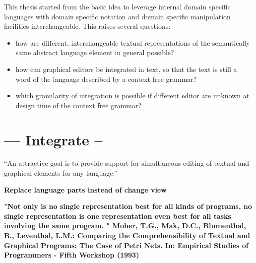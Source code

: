 This thesis started from the basic idea to leverage internal domain specific languages with domain specific notation and domain specific manipulation facilities interchangeable. This raises several questions:
\begin{itemize}
	\item how are different, interchangeable textual representations of the semantically same abstract language element in general possible?
	\item how can graphical editors be integrated in text, so that the text is still a word of the language described by a context free grammar?
	\item which granularity of integration is possible if different editor are unknown at design time of the context free grammar?
\end{itemize}



\section{--- Integrate --}

``An attractive goal is to provide support for simultaneous editing of textual and graphical elements for any language.''\cite{EMP}



\textbf{Replace language parts instead of change view}

\textbf{
"Not only is no single representation best for all kinds of programs, no single representation is one representation even best for all tasks involving the same  program. " Moher, T.G., Mak, D.C., Blumenthal, B., Leventhal, L.M.: Comparing the Comprehensibility of Textual and Graphical Programs: The Case of Petri Nets. In: Empirical Studies of Programmers - Fifth Workshop (1993)}




